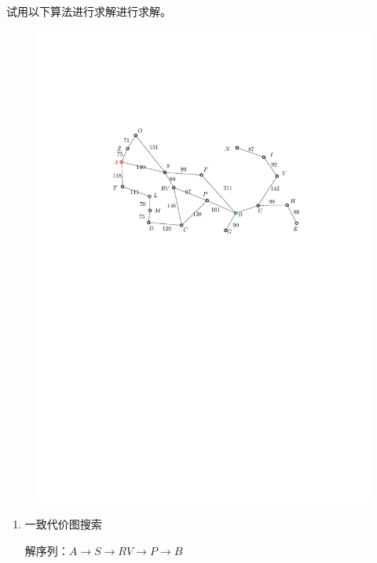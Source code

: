 \begin{example}
    试用以下算法进行求解进行求解。
    \begin{figure}[H]
        \centering
        \includegraphics{image/评价函数例题.pdf}
    \end{figure}
    \begin{enumerate}
        \item 一致代价图搜索
        
        \textcolor{main1}{解序列：}$A\to S\to RV\to P\to B$


\end{enumerate}
\end{example}
